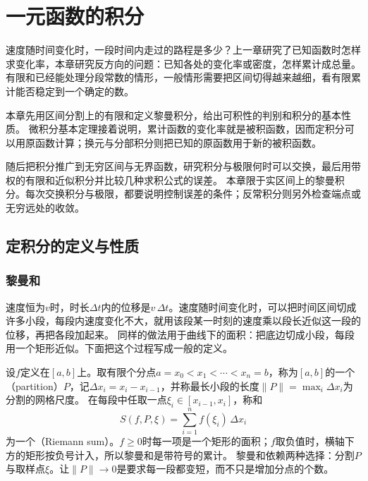 \chapter{一元函数的积分}
\label{chap:univariate-integration}

速度随时间变化时，一段时间内走过的路程是多少？上一章研究了已知函数时怎样求变化率，本章研究反方向的问题：已知各处的变化率或密度，怎样累计成总量。
有限和已经能处理分段常数的情形，一般情形需要把区间切得越来越细，看有限累计能否稳定到一个确定的数。

本章先用区间分割上的有限和定义黎曼积分，给出可积性的判别和积分的基本性质。
微积分基本定理接着说明，累计函数的变化率就是被积函数，因而定积分可以用原函数计算；换元与分部积分则把已知的原函数用于新的被积函数。

随后把积分推广到无穷区间与无界函数，研究积分与极限何时可以交换，最后用带权的有限和近似积分并比较几种求积公式的误差。
本章限于实区间上的黎曼积分。每次交换积分与极限，都要说明控制误差的条件；反常积分则另外检查端点或无穷远处的收敛。

\section{定积分的定义与性质}
\label{sec:ru-riemann-integral}

\subsection{黎曼和}
\label{sec:ru-riemann-sums}

速度恒为$v$时，时长$\Delta t$内的位移是$v\,\Delta t$。速度随时间变化时，可以把时间区间切成许多小段，每段内速度变化不大，就用该段某一时刻的速度乘以段长近似这一段的位移，再把各段加起来。
同样的做法用于曲线下的面积：把底边切成小段，每段用一个矩形近似。下面把这个过程写成一般的定义。

设$f$定义在$[a,b]$上。取有限个分点$a=x_0<x_1<\cdots<x_n=b$，称为$[a,b]$的一个（partition）$P$，记$\Delta x_i=x_i-x_{i-1}$，并称最长小段的长度$\|P\|=\max_i\Delta x_i$为分割的网格尺度。
在每段中任取一点$\xi_i\in[x_{i-1},x_i]$，称和
\[
 S(f,P,\xi)=\sum_{i=1}^nf(\xi_i)\,\Delta x_i
\]
为一个（Riemann sum）。$f\geq0$时每一项是一个矩形的面积；$f$取负值时，横轴下方的矩形按负号计入，所以黎曼和是带符号的累计。
黎曼和依赖两种选择：分割$P$与取样点$\xi$。让$\|P\|\to0$是要求每一段都变短，而不只是增加分点的个数。

